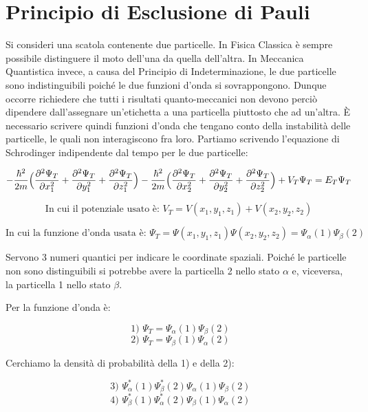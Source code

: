 
\section{Principio di Esclusione di Pauli}

Si consideri una scatola contenente due particelle. In Fisica Classica è sempre possibile distinguere il moto dell'una da quella dell'altra.
In Meccanica Quantistica invece, a causa del Principio di Indeterminazione, le due particelle sono indistinguibili poiché le due funzioni d'onda si sovrappongono.
Dunque occorre richiedere che tutti i risultati quanto-meccanici non devono perciò dipendere dall'assegnare un'etichetta a una particella piuttosto che ad un'altra.
È necessario scrivere quindi funzioni d'onda che tengano conto della instabilità delle particelle, le quali non interagiscono fra loro.
Partiamo scrivendo l'equazione di Schrodinger indipendente dal tempo per le due particelle:

\begin{equation}
- \frac{\hbar^2}{2m} \Bigl(  \frac{\partial^2 \Psi_T}{\partial x_1^2} + \frac{\partial^2 \Psi_T}{\partial y_1^2} + \frac{\partial^2 \Psi_T}{\partial z_1^2}  \Bigr) 
- \frac{\hbar^2}{2m} \Bigl(  \frac{\partial^2 \Psi_T}{\partial x_2^2} + \frac{\partial^2 \Psi_T}{\partial y_2^2} + \frac{\partial^2 \Psi_T}{\partial z_2^2}  \Bigr) 
+ V_T \Psi_T = E_T \Psi_T
\end{equation}

$$\mbox{In cui il potenziale usato è: } V_T = V(x_1, y_1, z_1) + V(x_2, y_2, z_2) $$

$$\mbox{In cui la funzione d'onda usata è: } \Psi_T = \Psi(x_1, y_1, z_1) \Psi(x_2, y_2, z_2) = \Psi_\alpha(1) \Psi_\beta(2)$$

Servono 3 numeri quantici per indicare le coordinate spaziali.
Poiché le particelle non sono distinguibili si potrebbe avere la particella 2 nello stato $\alpha$ e, viceversa, la particella 1 nello stato $\beta$.

Per la funzione d'onda è:

$$ \mbox{ 1) } \Psi_T = \Psi_\alpha(1) \Psi_\beta(2) $$
$$ \mbox{ 2) } \Psi_T = \Psi_\beta(1) \Psi_\alpha(2) $$

Cerchiamo la densità di probabilità della 1) e della 2):

$$ \mbox{ 3) } \Psi_\alpha^\ast(1) \Psi_\beta^\ast(2) \Psi_\alpha(1) \Psi_\beta(2) $$
$$ \mbox{ 4) } \Psi_\beta^\ast(1) \Psi_\alpha^\ast(2) \Psi_\beta(1) \Psi_\alpha(2) $$

